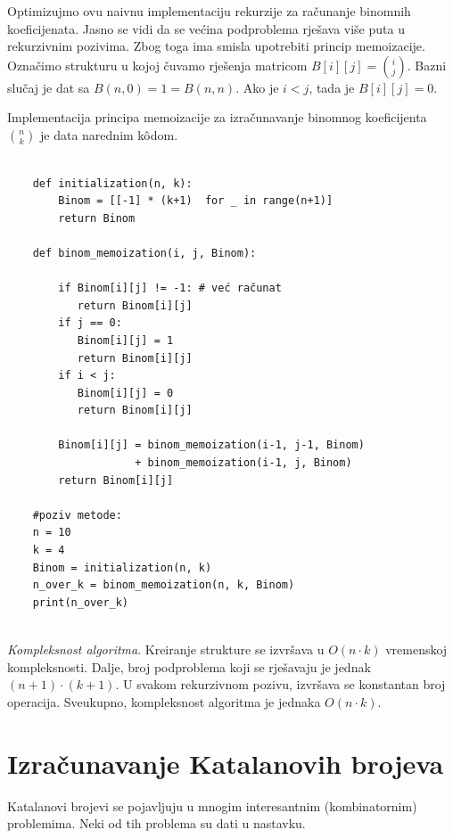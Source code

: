   Optimizujmo ovu naivnu implementaciju rekurzije za računanje binomnih koeficijenata.  Jasno se vidi da se većina podproblema rješava više puta u rekurzivnim pozivima. Zbog toga ima smisla upotrebiti princip memoizacije. Označimo strukturu u kojoj čuvamo rješenja matricom $B[i][j]= \binom{i}{j}$. Bazni slučaj je  dat sa $B(n, 0) = 1 = B(n,n)$. Ako je $i < j$, tada je $B[i][j] = 0$. 
  
  Implementacija principa memoizacije za izračunavanje binomnog koeficijenta $\binom{n}{k}$ je data narednim k\^odom. 
  
  \begin{verbatim}
  	
  	def initialization(n, k):
  	    Binom = [[-1] * (k+1)  for _ in range(n+1)] 
  	    return Binom 
  	    
  	def binom_memoization(i, j, Binom): 
  	    
  	    if Binom[i][j] != -1: # već računat
  	       return Binom[i][j] 
  	    if j == 0: 
  	       Binom[i][j] = 1
  	       return Binom[i][j] 
  	    if i < j: 
  	       Binom[i][j] = 0 
  	       return Binom[i][j]
  	       
  	    Binom[i][j] = binom_memoization(i-1, j-1, Binom) 
  	                + binom_memoization(i-1, j, Binom) 
  	    return Binom[i][j]

    #poziv metode:
    n = 10
    k = 4
    Binom = initialization(n, k) 
    n_over_k = binom_memoization(n, k, Binom) 
    print(n_over_k)
    
  \end{verbatim}  
  
  \textit{Kompleksnost algoritma}.  Kreiranje strukture se izvršava u $O(n\cdot k)$ vremenskoj kompleksnosti. Dalje,  broj podproblema koji se rješavaju je jednak $(n+1) \cdot (k+1)$.  U svakom rekurzivnom pozivu, izvršava se konstantan broj operacija. Sveukupno, kompleksnost algoritma je jednaka $O(n \cdot k)$. 
  
  
  
   
 \section{Izračunavanje Katalanovih brojeva}
 
 Katalanovi brojevi se pojavljuju u mnogim interesantnim (kombinatornim)
 problemima. Neki od tih problema su dati u nastavku. 
 
